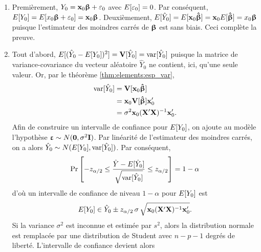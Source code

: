 \begin{solution}{3.5}
    \begin{enumerate}
    \item Premièrement, $Y_0 = \mathbf{x}_0 \boldsymbol{\upbeta} + \varepsilon_0$ avec
      $E [ \varepsilon_0 ] = 0$. Par conséquent, $E [ Y_0 ] = E [ x_0
        \boldsymbol{\upbeta} + \varepsilon_0 ] = \mathbf{x}_0 \boldsymbol{\upbeta}$. Deuxièmement,
      $E [ \hat{Y}_0 ] = E [ \mathbf{x}_0 \boldsymbol{\hat{\upbeta}} ] = \mathbf{x}_0
      E [ \boldsymbol{\hat{\upbeta}} ] = x_0 \boldsymbol{\upbeta}$ puisque l'estimateur des moindres
      carrés de $\boldsymbol{\upbeta}$ est sans biais. Ceci complète la preuve.
    \item Tout d'abord, $E [ (\hat{Y}_0 - E [ Y_0 ])^2 ] =
      \mathbf{V} [ \hat{Y}_0 ] = \mathrm{var} [ \hat{Y}_0 ]$ puisque la matrice de
      variance-covariance du vecteur aléatoire $\hat{Y}_0$ ne
      contient, ici, qu'une seule valeur. Or, par le théorème
      \ref{thm:elements:esp_var},
       \begin{align*}
         \mathrm{var} [ \hat{Y}_0 ]
         &= \mathbf{V} [ \mathbf{x}_0 \boldsymbol{\hat{\upbeta}} ] \\
         &= \mathbf{x}_0 \mathbf{V} [ \boldsymbol{\hat{\upbeta}} ] \mathbf{x}_0^\prime \\
         &= \sigma^2 \mathbf{x}_0 (\mathbf{X}^\prime \mathbf{X})^{-1}
         \mathbf{x}_0^\prime.
       \end{align*}
       Afin de construire un intervalle de confiance pour $E [ Y_0 ]$,
       on ajoute au modèle l'hypothèse $\boldsymbol{\upvarepsilon} \sim N(\mathbf{0}, \sigma^2
       \mathbf{I})$. Par linéarité de l'estimateur des moindres carrés,
       on a alors $\hat{Y}_0 \sim N(E [ Y_0 ], \mathrm{var} [ \hat{Y}_0 ])$. Par
       conséquent,
       \begin{displaymath}
         \Pr
         \left[
           -z_{\alpha/2}
           \leq
           \frac{\hat{Y} - E [ \hat{Y}_0 ]}{\sqrt{\mathrm{var} [ \hat{Y}_0 ]}}
           \leq
           z_{\alpha/2}
         \right] = 1 - \alpha
       \end{displaymath}
       d'où un intervalle de confiance de niveau $1 - \alpha$ pour
       $E [ Y_0 ]$ est
       \begin{displaymath}
         E [ Y_0 ]
         \in \hat{Y}_0 \pm z_{\alpha/2}\, \sigma\,
         \sqrt{\mathbf{x}_0 (\mathbf{X}^\prime \mathbf{X})^{-1} \mathbf{x}_0^\prime}.
       \end{displaymath}
       Si la variance $\sigma^2$ est inconnue et estimée par $s^2$,
       alors la distribution normale est remplacée par une
       distribution de Student avec $n - p - 1$ degrés de
       liberté. L'intervalle de confiance devient alors
       \begin{displaymath}

\end{displaymath}
\end{enumerate}
\end{solution}

